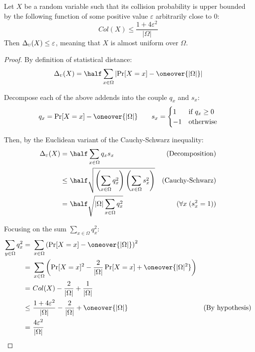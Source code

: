 \begin{lemma} \label{lem:colbound}
    Let $X$ be a random variable such that its collision probability is upper bounded by the following function of some positive value $\varepsilon$ arbitrarily close to $0$:
    \[
        Col(X) \leq \frac{1 + 4\varepsilon^2}{|\Omega|}
    \]
    Then $\Delta_\textsc{u}(X) \leq \varepsilon$, meaning that $X$ is almost uniform over $\Omega$.
\end{lemma}


\begin{proof}
    By definition of statistical distance:
    \[
        \sdtu(X) = \half \sum_{x \in \Omega} \left| \Pr[X = x] - \oneover{|\Omega|} \right|
    \]

    Decompose each of the above addends into the couple $q_x$ and $s_x$:
    \[
        q_x = \Pr[X = x] - \oneover{|\Omega|} \qquad s_x =
        \begin{cases}
            1  & \text{if $q_x \geq 0$} \\
            -1 & \text{otherwise}
        \end{cases}
    \]
    
    Then, by the Euclidean variant of the Cauchy-Schwarz inequality:
    \begin{align*}
        \sdtu(X) =&\ \half \sum_{x \in \Omega} q_x s_x                                                                & \text{(Decomposition)}     \\
              \leq&\ \half \sqrt{ \left( \sum_{x \in \Omega} q_x^2 \right) \left( \sum_{x \in \Omega} s_x^2 \right) } & \text{(Cauchy-Schwarz)}    \\
                 =&\ \half \sqrt{|\Omega| \sum_{x \in \Omega} q_x^2}                                                  & (\forall x \; (s_x^2 = 1)) \\
    \end{align*}

    Focusing on the sum $\sum_{x \in \Omega} q_x^2$:
    \begin{align*}
        \sum_{y \in \Omega} q_x^2 =&\ \sum_{x \in \Omega} \left( \Pr[X = x] - \oneover{|\Omega|} \right)^2                                   &                        \\
                                  =&\ \sum_{x \in \Omega} \left( \Pr[X = x]^2 - \frac{2}{|\Omega|} \Pr[X = x] + \oneover{|\Omega|^2} \right) &                        \\
                                  =&\ Col(X) - \frac{2}{|\Omega|} + \frac{1}{|\Omega|}                                                       &                        \\
                               \leq&\ \frac{1 + 4 \varepsilon^2}{|\Omega|} - \frac{2}{|\Omega|} + \oneover{|\Omega|}                         & \text{(By hypothesis)} \\
                                  =&\ \frac{4 \varepsilon^2}{|\Omega|}                                                                       &                        \\
    \end{align*}


\end{proof}
